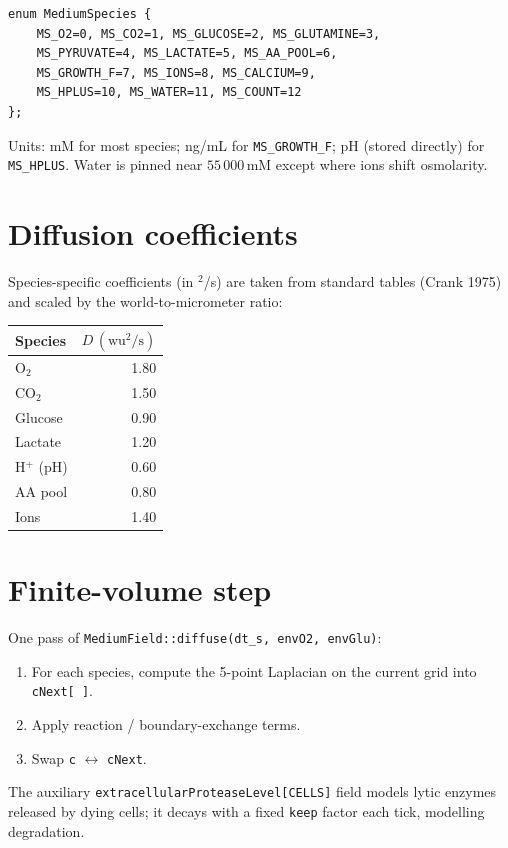 \documentclass[11pt,letterpaper,twoside,openany]{book}
\newcommand{\code}[1]{\texttt{#1}}
\newcommand{\wu}{\text{wu}}
\begin{document}
\begin{lstlisting}
enum MediumSpecies {
    MS_O2=0, MS_CO2=1, MS_GLUCOSE=2, MS_GLUTAMINE=3,
    MS_PYRUVATE=4, MS_LACTATE=5, MS_AA_POOL=6,
    MS_GROWTH_F=7, MS_IONS=8, MS_CALCIUM=9,
    MS_HPLUS=10, MS_WATER=11, MS_COUNT=12
};
\end{lstlisting}
Units: mM for most species; ng/mL for \code{MS\_GROWTH\_F}; pH
(stored directly) for \code{MS\_HPLUS}. Water is pinned near
$55\,000\,\text{mM}$ except where ions shift osmolarity.

\section{Diffusion coefficients}

Species-specific coefficients (in \wu$^2$/s) are taken from standard
tables (Crank 1975) and scaled by the world-to-micrometer ratio:
\begin{center}
\begin{tabular}{lr}
\toprule
Species & $D\,(\wu^2/\text{s})$\\ \midrule
O$_2$        & 1.80 \\
CO$_2$       & 1.50 \\
Glucose      & 0.90 \\
Lactate      & 1.20 \\
H$^+$ (pH)   & 0.60 \\
AA pool      & 0.80 \\
Ions         & 1.40 \\
\bottomrule
\end{tabular}
\end{center}

\section{Finite-volume step}

One pass of \code{MediumField::diffuse(dt\_s, envO2, envGlu)}:
\begin{enumerate}
  \item For each species, compute the 5-point Laplacian on the
        current grid into \code{cNext[\,]}.
  \item Apply reaction / boundary-exchange terms.
  \item Swap \code{c} $\leftrightarrow$ \code{cNext}.
\end{enumerate}

The auxiliary \code{extracellularProteaseLevel[CELLS]} field models
lytic enzymes released by dying cells; it decays with a fixed
\texttt{keep} factor each tick, modelling degradation.
\end{document}
